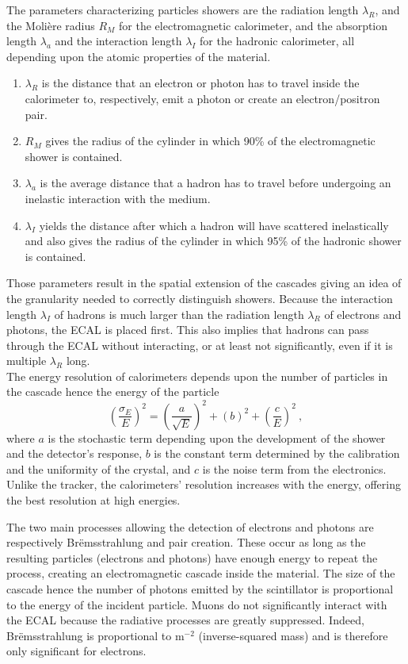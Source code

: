  The parameters characterizing particles showers are the radiation length $ \lambda_R $, and the Molière radius $ R_M $ for the electromagnetic calorimeter, and the absorption length $ \lambda_a $ and the interaction length $ \lambda_I $ for the hadronic calorimeter, all depending upon the atomic properties of the material.
  \begin{enumerate}
    \item[] $ \lambda_R $ is the distance that an electron or photon has to travel inside the calorimeter to, respectively, emit a photon or create an electron/positron pair.
    \item[] $ R_M $ gives the radius of the cylinder in which 90\% of the electromagnetic shower is contained.
    \item[] $ \lambda_a $ is the average distance that a hadron has to travel before undergoing an inelastic interaction with the medium.
    \item[] $ \lambda_I $ yields the distance after which a hadron will have scattered inelastically and also gives the radius of the cylinder in which 95\% of the hadronic shower is contained.
  \end{enumerate}
  Those parameters result in the spatial extension of the cascades giving an idea of the granularity needed to correctly distinguish showers. Because the interaction length $ \lambda_I $ of hadrons is much larger than the radiation length $ \lambda_R $ of electrons and photons, the ECAL is placed first. This also implies that hadrons can pass through the ECAL without interacting, or at least not significantly, even if it is multiple $ \lambda_R $ long. \\

  The energy resolution of calorimeters depends upon the number of particles in the cascade hence the energy of the particle
  \begin{equation}
    \left( \frac{\sigma_E}{E} \right)^2 = \left( \frac{a}{\sqrt{E}} \right)^2 + \left( b \right)^2 + \left( \frac{c}{E} \right)^2 \ ,
  \end{equation}
  where $ a $ is the stochastic term depending upon the development of the shower and the detector's response, $ b $ is the constant term determined by the calibration and the uniformity of the crystal, and $ c $ is the noise term from the electronics. Unlike the tracker, the calorimeters' resolution increases with the energy, offering the best resolution at high energies.

  The two main processes allowing the detection of electrons and photons are respectively Brëmsstrahlung and pair creation. These occur as long as the resulting particles (electrons and photons) have enough energy to repeat the process, creating an electromagnetic cascade inside the material. The size of the cascade hence the number of photons emitted by the scintillator is proportional to the energy of the incident particle. Muons do not significantly interact with the ECAL because the radiative processes are greatly suppressed. Indeed, Brëmsstrahlung is proportional to m$ ^{-2} $ (inverse-squared mass) and is therefore only significant for electrons. \\

